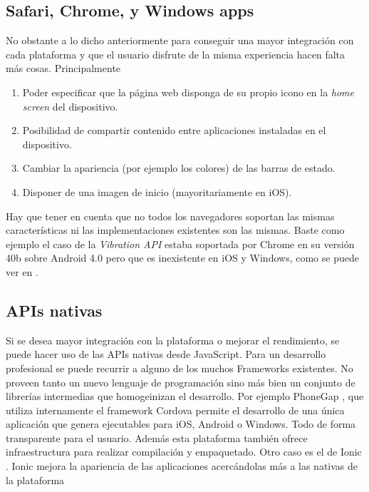 \documentclass[
10pt, %
a4paper, %
oneside, %
headinclude,footinclude, %
BCOR5mm, %
]{scrartcl}
\begin{document}
\subsection{Safari, Chrome, y Windows apps}
No obstante a lo dicho anteriormente para conseguir una mayor integración con cada plataforma y que el usuario disfrute de la misma experiencia hacen falta más cosas. Principalmente 

\begin{enumerate}
\item Poder especificar que la página web disponga de su propio icono en la \textit{home screen} del dispositivo.
\item Posibilidad de compartir contenido entre aplicaciones instaladas en el dispositivo.
\item Cambiar la apariencia (por ejemplo los colores) de las barras de estado.
\item Disponer de una imagen de inicio (mayoritariamente en iOS).
\end{enumerate}

Hay que tener en cuenta que no todos los navegadores soportan las mismas características ni las implementaciones existentes son las mismas. Baste como ejemplo el caso de la \textit{Vibration API} estaba soportada por Chrome en su versión 40b sobre Android 4.0 pero que es inexistente en iOS y Windows, como se puede ver en \cite{mozilla_developer_network_web_2016}.

\subsection{APIs nativas}
Si se desea mayor integración con la plataforma o mejorar el rendimiento, se puede hacer uso de las APIs nativas desde JavaScript. Para un desarrollo profesional se puede recurrir a alguno de los muchos Frameworks existentes. No proveen tanto un nuevo lenguaje de programación sino más bien un conjunto de librerías intermedias que homogeinizan el desarrollo. Por ejemplo PhoneGap \cite{adobe_systems_inc._phonegap_2016}, que utiliza internamente el framework Cordova \cite{the_apache_software_foundation_apache_2016} permite el desarrollo de una única aplicación que genera ejecutables para iOS, Android o Windows. Todo de forma transparente para el usuario. Además esta plataforma también ofrece infraestructura para realizar compilación y empaquetado.
Otro caso es el de Ionic \cite{drifty_co._building_2016}. Ionic mejora la apariencia de las aplicaciones acercándolas más a las nativas de la plataforma \cite{kacie_clark_introduction_2015}
\end{document}
